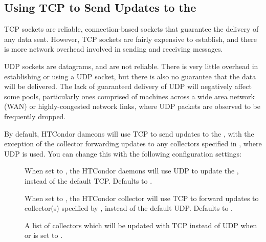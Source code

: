 \subsection{\label{sec:tcp-collector-update}Using TCP to Send Updates to
the }


TCP sockets are reliable, connection-based sockets that guarantee
the delivery of any data sent.
However, TCP sockets are fairly expensive to establish, and there is more
network overhead involved in sending and receiving messages.

UDP sockets are datagrams, and are not reliable.
There is very little overhead in establishing or using a UDP socket,
but there is also no guarantee that the data will be delivered.
The lack of guaranteed delivery of UDP will negatively affect some pools,
particularly ones comprised of machines across a wide area network (WAN)
or highly-congested network links, where UDP packets are observed to be
frequently dropped.

By default, HTCondor dameons will use TCP to send updates to the
, with the exception of the collector forwarding
updates to any collectors specified in ,
where UDP is used.
You can change this with the following configuration settings:

\begin{description}

\item[]
  When set to , the HTCondor daemons will use UDP to
  update the , instead of the default TCP.
  Defaults to .

\item[]
  When set to , the HTCondor collector will use TCP to
  forward updates to collector(s) specified by ,
  instead of the default UDP.
  Defaults to .

\item[]
  A list of collectors which will be updated with TCP instead of UDP
  when  or
   is set to .

\end{description}

